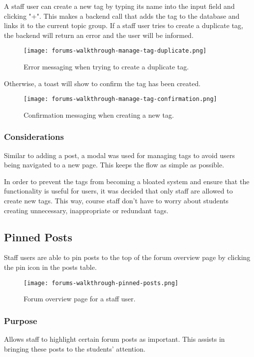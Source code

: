 A staff user can create a new tag by typing its name into the input field and clicking "+".
This makes a backend call that adds the tag to the database and links it to the current topic group.
If a staff user tries to create a duplicate tag, the backend will return an error and the user will be informed.

\begin{figure}[h!]
    \texttt{[image: forums-walkthrough-manage-tag-duplicate.png]}
    \centering
    \caption{Error messaging when trying to create a duplicate tag.}
\end{figure}

Otherwise, a toast will show to confirm the tag has been created.

\begin{figure}[h!]
    \texttt{[image: forums-walkthrough-manage-tag-confirmation.png]}
    \centering
    \caption{Confirmation messaging when creating a new tag.}
\end{figure}

\subsubsection{Considerations}
Similar to adding a post, a modal was used for managing tags to avoid users being navigated to a new page.
This keeps the flow as simple as possible.

In order to prevent the tags from becoming a bloated system and ensure that the functionality is useful for users, it was decided that only staff are allowed to create new tags.
This way, course staff don't have to worry about students creating unnecessary, inappropriate or redundant tags.

\subsection{Pinned Posts}
Staff users are able to pin posts to the top of the forum overview page by clicking the pin icon in the posts table.

\begin{figure}[h!]
    \texttt{[image: forums-walkthrough-pinned-posts.png]}
    \centering
    \caption{Forum overview page for a staff user.}
\end{figure}

\subsubsection{Purpose}
Allows staff to highlight certain forum posts as important.
This assists in bringing these posts to the students' attention.

